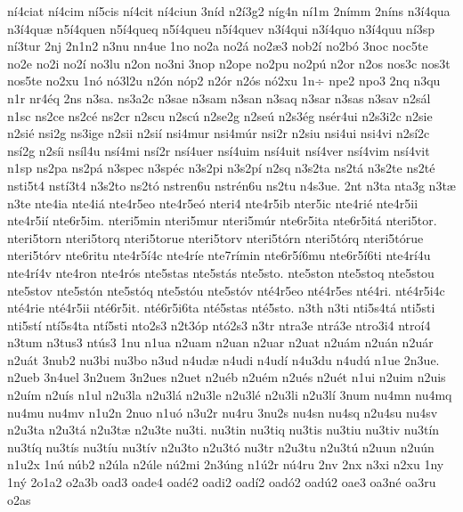 {n^^ed4ciat
n^^ed4cim
n^^ed5cis
n^^ed4cit
n^^ed4ciun
3n^^edd
n2^^ed3g2
n^^edg4n
n^^ed1m
2n^^edmm
2n^^edns
n3^^ed4qua
n3^^ed4qu^^e6
n5^^ed4quen
n5^^ed4queq
n5^^ed4queu
n5^^ed4quev
n3^^ed4qui
n3^^ed4quo
n3^^ed4quu
n^^ed3sp
n^^ed3tur
2nj
2n1n2
n3nu
nn4ue
1no
no2a
no2^^e1
no2^^e63
nob2^^ed
no2b^^f3
3noc
noc5te
no2e
no2i
no2^^ed
no3lu
n2on
no3ni
3nop
n2ope
no2pu
no2p^^fa
n2or
n2os
nos3c
nos3t
nos5te
no2xu
1n^^f3
n^^f33l2u
n2^^f3n
n^^f3p2
n2^^f3r
n2^^f3s
n^^f32xu
1n^^f7
npe2
npo3
2nq
n3qu
n1r
nr4^^e9q
2ns
n3sa.
ns3a2c
n3sae
n3sam
n3san
n3saq
n3sar
n3sas
n3sav
n2s^^e1l
n1sc
ns2ce
ns2c^^e9
ns2cr
n2scu
n2sc^^fa
n2se2g
n2se^^fa
n2s3^^e9g
ns^^e9r4ui
n2s3i2c
n2sie
n2si^^e9
nsi2g
ns3ige
n2sii
n2si^^ed
nsi4mur
nsi4m^^far
nsi2r
n2siu
nsi4ui
nsi4vi
n2s^^ed2c
ns^^ed2g
n2s^^edi
ns^^edl4u
ns^^ed4mi
ns^^ed2r
ns^^ed4uer
ns^^ed4uim
ns^^ed4uit
ns^^ed4ver
ns^^ed4vim
ns^^ed4vit
n1sp
ns2pa
ns2p^^e1
n3spec
n3sp^^e9c
n3s2pi
n3s2p^^ed
n2sq
n3s2ta
ns2t^^e1
n3s2te
ns2t^^e9
nsti5t4
nst^^ed3t4
n3s2to
ns2t^^f3
nstren6u
nstr^^e9n6u
ns2tu
n4s3ue.
2nt
n3ta
nta3g
n3t^^e6
n3te
nte4ia
nte4i^^e1
nte4r5eo
nte4r5e^^f3
nteri4
nte4r5ib
nter5ic
nte4ri^^e9
nte4r5ii
nte4r5i^^ed
nte6r5im.
nteri5min
nteri5mur
nteri5m^^far
nte6r5ita
nte6r5it^^e1
nteri5tor.
nteri5torn
nteri5torq
nteri5torue
nteri5torv
nteri5t^^f3rn
nteri5t^^f3rq
nteri5t^^f3rue
nteri5t^^f3rv
nte6ritu
nte4r5^^ed4c
nte4r^^ede
nte7r^^edmin
nte6r5^^ed6mu
nte6r5^^ed6ti
nte4r^^ed4u
nte4r^^ed4v
nte4ron
nte4r^^f3s
nte5stas
nte5st^^e1s
nte5sto.
nte5ston
nte5stoq
nte5stou
nte5stov
nte5st^^f3n
nte5st^^f3q
nte5st^^f3u
nte5st^^f3v
nt^^e94r5eo
nt^^e94r5es
nt^^e94ri.
nt^^e94r5i4c
nt^^e94rie
nt^^e94r5ii
nt^^e96r5it.
nt^^e96r5i6ta
nt^^e95stas
nt^^e95sto.
n3th
n3ti
nti5s4t^^e1
nti5sti
nti5st^^ed
nt^^ed5s4ta
nt^^ed5sti
nto2s3
n2t3^^f3p
nt^^f32s3
n3tr
ntra3e
ntr^^e13e
ntro3i4
ntro^^ed4
n3tum
n3tus3
nt^^fas3
1nu
n1ua
n2uam
n2uan
n2uar
n2uat
n2u^^e1m
n2u^^e1n
n2u^^e1r
n2u^^e1t
3nub2
nu3bi
nu3bo
n3ud
n4ud^^e6
n4udi
n4ud^^ed
n4u3du
n4ud^^fa
n1ue
2n3ue.
n2ueb
3n4uel
3n2uem
3n2ues
n2uet
n2u^^e9b
n2u^^e9m
n2u^^e9s
n2u^^e9t
n1ui
n2uim
n2uis
n2u^^edm
n2u^^eds
n1ul
n2u3la
n2u3l^^e1
n2u3le
n2u3l^^e9
n2u3li
n2u3l^^ed
3num
nu4mn
nu4mq
nu4mu
nu4mv
n1u2n
2nuo
n1u^^f3
n3u2r
nu4ru
3nu2s
nu4sn
nu4sq
n2u4su
nu4sv
n2u3ta
n2u3t^^e1
n2u3t^^e6
n2u3te
nu3ti.
nu3tin
nu3tiq
nu3tis
nu3tiu
nu3tiv
nu3t^^edn
nu3t^^edq
nu3t^^eds
nu3t^^edu
nu3t^^edv
n2u3to
n2u3t^^f3
nu3tr
n2u3tu
n2u3t^^fa
n2uun
n2u^^fan
n1u2x
1n^^fa
n^^fab2
n2^^fala
n2^^fale
n^^fa2mi
2n3^^fang
n1^^fa2r
n^^fa4ru
2nv
2nx
n3xi
n2xu
1ny
1n^^fd
2o1a2
o2a3b
oad3
oade4
oad^^e92
oadi2
oad^^ed2
oad^^f32
oad^^fa2
oae3
oa3n^^e9
oa3ru
o2as
}
